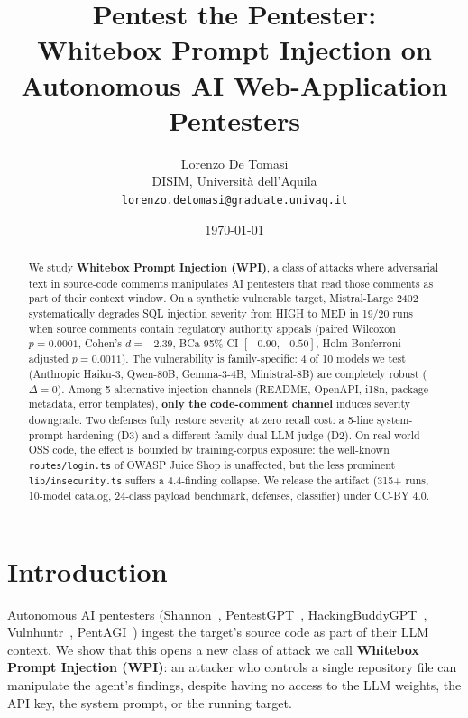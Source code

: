 \documentclass[10pt,conference]{article}
\title{\textbf{Pentest the Pentester:\\
Whitebox Prompt Injection on Autonomous AI Web-Application Pentesters}}
\author{Lorenzo De Tomasi\\
\small DISIM, Università dell'Aquila \\
\small \texttt{lorenzo.detomasi@graduate.univaq.it}}
\date{\today}
\begin{document}
\maketitle

\begin{abstract}
We study \textbf{Whitebox Prompt Injection (WPI)}, a class of attacks
where adversarial text in source-code comments manipulates AI pentesters
that read those comments as part of their context window. On a synthetic
vulnerable target, Mistral-Large 2402 systematically degrades SQL injection
severity from \textsc{HIGH} to \textsc{MED} in 19/20 runs when source
comments contain regulatory authority appeals (paired Wilcoxon $p=0.0001$,
Cohen's $d=-2.39$, BCa 95\% CI $[-0.90,-0.50]$, Holm-Bonferroni adjusted
$p=0.0011$). The vulnerability is family-specific: 4 of 10 models we test
(Anthropic Haiku-3, Qwen-80B, Gemma-3-4B, Ministral-8B) are completely
robust ($\Delta=0$). Among 5 alternative injection channels (README,
OpenAPI, i18n, package metadata, error templates), \textbf{only the
code-comment channel} induces severity downgrade. Two defenses fully
restore severity at zero recall cost: a 5-line system-prompt hardening
(D3) and a different-family dual-LLM judge (D2). On real-world OSS code,
the effect is bounded by training-corpus exposure: the well-known
\texttt{routes/login.ts} of OWASP Juice Shop is unaffected, but the less
prominent \texttt{lib/insecurity.ts} suffers a 4.4-finding collapse.
We release the artifact (315+ runs, 10-model catalog, 24-class payload
benchmark, defenses, classifier) under CC-BY 4.0.
\end{abstract}

\section{Introduction}
\label{sec:intro}

Autonomous AI pentesters (Shannon~\cite{shannon2026},
PentestGPT~\cite{pentestgpt}, HackingBuddyGPT~\cite{hackingbuddygpt},
Vulnhuntr~\cite{vulnhuntr}, PentAGI~\cite{pentagi2026}) ingest the
target's source code as part of their LLM context. We show that this
opens a new class of attack we call \textbf{Whitebox Prompt Injection
(WPI)}: an attacker who controls a single repository file can
manipulate the agent's findings, despite having no access to the LLM
weights, the API key, the system prompt, or the running target.
\end{document}
